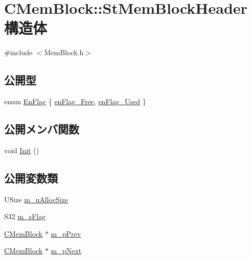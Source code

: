 \hypertarget{struct_c_mem_block_1_1_st_mem_block_header}{}\section{C\+Mem\+Block\+:\+:St\+Mem\+Block\+Header 構造体}
\label{struct_c_mem_block_1_1_st_mem_block_header}


{\ttfamily \#include $<$Mem\+Block.\+h$>$}

\subsection*{公開型}
\begin{DoxyCompactItemize}
\item 
enum \hyperlink{struct_c_mem_block_1_1_st_mem_block_header_af862b5b841afc92fb1f96a403b85d0d3}{En\+Flag} \{ \hyperlink{struct_c_mem_block_1_1_st_mem_block_header_af862b5b841afc92fb1f96a403b85d0d3ad5570458e60e586877c5c7f6861abbae}{en\+Flag\+\_\+\+Free}, 
\hyperlink{struct_c_mem_block_1_1_st_mem_block_header_af862b5b841afc92fb1f96a403b85d0d3a4085fda7f46e872514d6dffeb378d8da}{en\+Flag\+\_\+\+Used}
 \}
\end{DoxyCompactItemize}
\subsection*{公開メンバ関数}
\begin{DoxyCompactItemize}
\item 
void \hyperlink{struct_c_mem_block_1_1_st_mem_block_header_aabc565788807b9f94d2ed84daadd52ee}{Init} ()
\end{DoxyCompactItemize}
\subsection*{公開変数類}
\begin{DoxyCompactItemize}
\item 
U\+Size \hyperlink{struct_c_mem_block_1_1_st_mem_block_header_a6196b148899e1e848178ac0fb4558631}{m\+\_\+u\+Alloc\+Size}
\item 
S32 \hyperlink{struct_c_mem_block_1_1_st_mem_block_header_a03465c909a135c3df47c8fd29d6d1e62}{m\+\_\+s\+Flag}
\item 
\hyperlink{class_c_mem_block}{C\+Mem\+Block} $\ast$ \hyperlink{struct_c_mem_block_1_1_st_mem_block_header_a1c67a679f3d7591a55cbc3c30623a775}{m\+\_\+p\+Prev}
\item 
\hyperlink{class_c_mem_block}{C\+Mem\+Block} $\ast$ \hyperlink{struct_c_mem_block_1_1_st_mem_block_header_a499c6f32668e35c16009557d7aadefea}{m\+\_\+p\+Next}
\end{DoxyCompactItemize}


